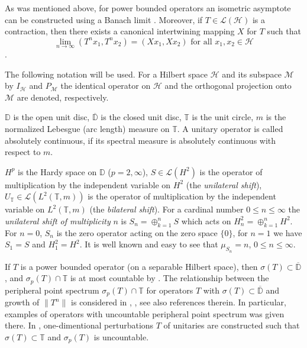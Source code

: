 \documentclass[a4paper,oneside,11pt]{amsart}
\numberwithin{equation}{section}
\theoremstyle{plain}
\theoremstyle{definition}
\begin{document}
As was mentioned above, for power bounded operators an isometric asymptote can be constructed using a Banach limit \cite{ker89}. Moreover, if  $T\in\mathcal L(\mathcal H)$ is a contraction, then there exists a canonical intertwining mapping $X$ for $T$ such that 
\begin{equation}\label{lim} \lim_{n\to\infty}(T^nx_1, T^nx_2)=(Xx_1,Xx_2) 
\text{ for all } x_1,x_2\in\mathcal H \end{equation}
{\cite[Sec. IX.1]{nfbk}}. 

The following notation will be used. For a Hilbert space $\mathcal H$ and its subspace $\mathcal M$ by $I_{\mathcal H}$ and $P_{\mathcal M}$ the identical operator on $\mathcal H$ and the orthogonal projection onto $\mathcal M$ are denoted, respectively.

$\mathbb D$ is the open unit disc, $\overline{\mathbb D}$ is the closed unit disc,  $\mathbb T$ is the unit circle, 
$m$ is the normalized Lebesgue (arc length) measure on $\mathbb T$. A unitary operator is called absolutely continuous, if  its spectral measure is absolutely continuous with respect to $m$. 

$H^p$ is the Hardy space on $\mathbb D$ ($p=2, \infty$), 
$S\in \mathcal L(H^2)$ is the operator of multiplication by the independent variable on $H^2$ (the  \emph{unilateral shift}),
$U_{\mathbb T}\in \mathcal L(L^2(\mathbb T,m))$ is the operator of multiplication by the independent variable on $L^2(\mathbb T,m)$
 (the  \emph{bilateral shift}). 
For a cardinal number $0\leq n\leq \infty$ the \emph{unilateral shift of multiplicity} $n$ is 
$S_n=\oplus_{k=1}^n S$ which acts on $H^2_n=\oplus_{k=1}^n H^2$. For $n=0$, $S_n$ is the zero operator acting on the zero space $\{0\}$, 
for $n=1$ we have  $S_1=S$ and $H^2_1=H^2$. It is well known and easy to see that $\mu_{S_n}=n$, $0\leq n\leq \infty$. 


If $T$ is a power bounded operator (on a separable Hilbert space), then $\sigma(T)\subset\overline{\mathbb D}$,  and 
$\sigma_p(T)\cap\mathbb T$ is at most countable by \cite{jamison}.
The relationship between the peripheral point spectrum 
$\sigma_p(T)\cap\mathbb T$ for operators $T$ with 
$\sigma(T)\subset\overline{\mathbb D}$ and growth
of  $\|T^n\|$  is considered in \cite{elfallahransford}, \cite{eisnergrivaux}, see also references therein. 
In  particular, examples of operators with uncountable  peripheral point spectrum  was given there. 
In \cite{ma1}, \cite{ma2} one-dimentional perturbations $T$ of unitaries are constructed such that $\sigma(T)\subset \mathbb T$ and $\sigma_p(T)$ is  uncountable. 
\end{document}
